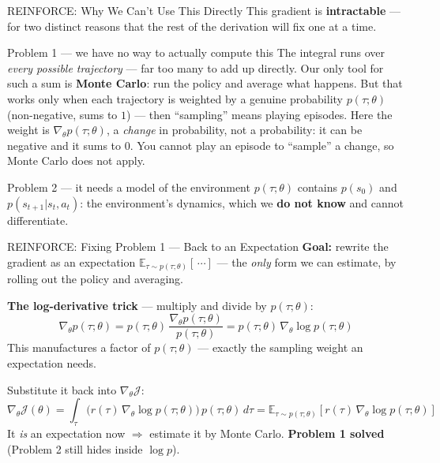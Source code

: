 \begin{frame}{REINFORCE: Why We Can't Use This Directly}
This gradient is \textbf{intractable} --- for two distinct reasons that the rest of the derivation will fix one at a time.
\vspace{0.4em}
\begin{block}{Problem 1 --- we have no way to actually compute this}
The integral runs over \emph{every possible trajectory} --- far too many to add up directly. Our only tool for such a sum is \textbf{Monte Carlo}: run the policy and average what happens. But that works only when each trajectory is weighted by a genuine probability $p(\tau;\theta)$ (non-negative, sums to $1$) --- then ``sampling'' means playing episodes. Here the weight is $\nabla_\theta p(\tau;\theta)$, a \emph{change} in probability, not a probability: it can be negative and it sums to $0$. You cannot play an episode to ``sample'' a change, so Monte Carlo does not apply.
\end{block}
\pause
\begin{block}{Problem 2 --- it needs a model of the environment}
$p(\tau;\theta)$ contains $p(s_0)$ and $p(s_{t+1}|s_t, a_t)$: the environment's dynamics, which we \textbf{do not know} and cannot differentiate.
\end{block}
\end{frame}

\begin{frame}{REINFORCE: Fixing Problem 1 --- Back to an Expectation}
\textbf{Goal:} rewrite the gradient as an expectation $\mathbb{E}_{\tau \sim p(\tau;\theta)}[\,\cdots]$ --- the \emph{only} form we can estimate, by rolling out the policy and averaging.
\pause
\vspace{0.5em}

\textbf{The log-derivative trick} --- multiply and divide by $p(\tau;\theta)$:
$$\nabla_\theta p(\tau;\theta) = p(\tau;\theta)\, \frac{\nabla_\theta p(\tau;\theta)}{p(\tau;\theta)} = p(\tau;\theta)\, \nabla_\theta \log p(\tau;\theta)$$
This manufactures a factor of $p(\tau;\theta)$ --- exactly the sampling weight an expectation needs.
\pause
\vspace{0.3em}

Substitute it back into $\nabla_\theta \mathcal{J}$:
$$\nabla_\theta \mathcal{J}(\theta) = \int_\tau \big( r(\tau)\, \nabla_\theta \log p(\tau;\theta) \big)\, p(\tau;\theta)\, d\tau = \mathbb{E}_{\tau \sim p(\tau;\theta)}\!\left[ r(\tau)\, \nabla_\theta \log p(\tau;\theta) \right]$$
It \emph{is} an expectation now $\Rightarrow$ estimate it by Monte Carlo. \textbf{Problem 1 solved} (Problem 2 still hides inside $\log p$).
\end{frame}

